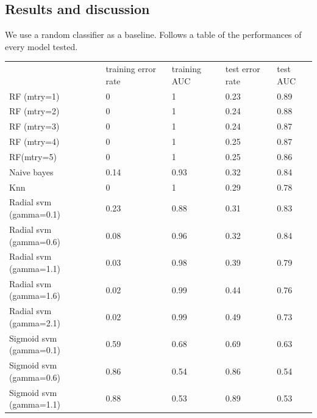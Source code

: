 \documentclass{article}
\begin{document}
\subsection{Results and discussion}
We use a random classifier as a baseline.
Follows a table of the performances of every model tested.
\\
\begin{table}[H]
\begin{tabular}{lllll}
                         & training error rate & training AUC & test error rate & test AUC \\
RF (mtry=1)              & 0                   & 1            & 0.23            & 0.89     \\
RF (mtry=2)              & 0                   & 1            & 0.24            & 0.88     \\
RF (mtry=3)              & 0                   & 1            & 0.24            & 0.87     \\
RF (mtry=4)              & 0                   & 1            & 0.25            & 0.87     \\
RF(mtry=5)               & 0                   & 1            & 0.25            & 0.86     \\
Naive bayes              & 0.14                & 0.93         & 0.32            & 0.84     \\
Knn                      & 0                   & 1            & 0.29            & 0.78     \\
Radial svm (gamma=0.1)   & 0.23                & 0.88         & 0.31            & 0.83     \\
Radial svm (gamma=0.6)   & 0.08                & 0.96         & 0.32            & 0.84     \\
Radial svm (gamma=1.1)   & 0.03                & 0.98         & 0.39            & 0.79     \\
Radial svm (gamma=1.6)   & 0.02                & 0.99         & 0.44            & 0.76     \\
Radial svm (gamma=2.1)   & 0.02                & 0.99         & 0.49            & 0.73     \\
Sigmoid svm (gamma=0.1) & 0.59                & 0.68         & 0.69            & 0.63     \\
Sigmoid svm (gamma=0.6) & 0.86                & 0.54         & 0.86            & 0.54     \\
Sigmoid svm (gamma=1.1) & 0.88                & 0.53         & 0.89            & 0.53     \\

\end{tabular}
\end{table}
\end{document}
